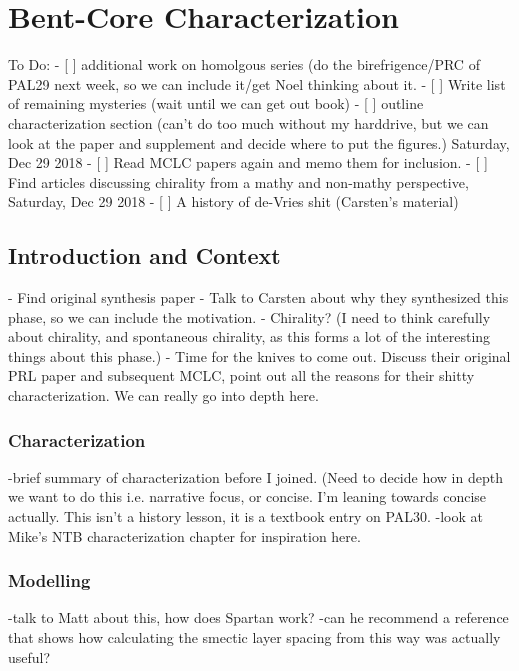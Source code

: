 \chapter{Bent-Core Characterization}
To Do:
- [ ] additional work on homolgous series (do the birefrigence/PRC of PAL29 next
week, so we can include it/get Noel thinking about it.
- [ ] Write list of remaining mysteries (wait until we can get out book)
- [ ] outline characterization section (can't do too much without my harddrive,
but we can look at the paper and supplement and decide where to put the
figures.) Saturday, Dec 29 2018
- [ ]  Read MCLC papers again and memo them for inclusion.
- [ ] Find articles discussing chirality from a mathy and non-mathy perspective,
Saturday, Dec 29 2018
- [ ] A history of de-Vries shit (Carsten's material)

\section{Introduction and Context}
- Find original synthesis paper
- Talk to Carsten about why they synthesized this phase, so we can include the
motivation.
- Chirality? (I need to think carefully about chirality, and spontaneous
chirality, as this forms a lot of the interesting things about this phase.)
- Time for the knives to come out. Discuss their original PRL paper and
subsequent MCLC, point out all the reasons for their shitty characterization. We
can really go into depth here.

\subsection{Characterization}
-brief summary of characterization before I joined. (Need to decide how in depth
we want to do this i.e. narrative focus, or concise. I'm leaning towards concise
actually. This isn't a history lesson, it is a textbook entry on PAL30. 
-look at Mike's NTB characterization chapter for inspiration here.
\subsection{Modelling}
-talk to Matt about this, how does Spartan work?
-can he recommend a reference that shows how calculating the smectic layer
spacing from this way was actually useful?

